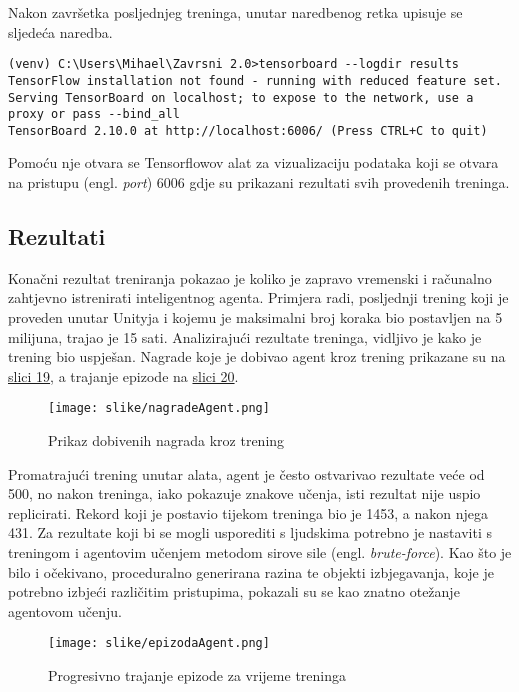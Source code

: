 \documentclass[]{foi} %
\begin{document}
Nakon završetka posljednjeg treninga, unutar naredbenog retka upisuje se sljedeća naredba. 

\begin{lstlisting}[style=cmd, numbers=none, caption={Vizualizacija rezultata treninga}]
(venv) C:\Users\Mihael\Zavrsni 2.0>tensorboard --logdir results
TensorFlow installation not found - running with reduced feature set.
Serving TensorBoard on localhost; to expose to the network, use a proxy or pass --bind_all
TensorBoard 2.10.0 at http://localhost:6006/ (Press CTRL+C to quit)
\end{lstlisting}

Pomoću nje otvara se Tensorflowov alat za vizualizaciju podataka koji se otvara na pristupu (engl. \textit{port}) 6006 gdje su prikazani rezultati svih provedenih treninga. 

\subsection{Rezultati}
Konačni rezultat treniranja pokazao je koliko je zapravo vremenski i računalno zahtjevno istrenirati inteligentnog agenta. Primjera radi, posljednji trening koji je proveden unutar Unityja i kojemu je maksimalni broj koraka bio postavljen na 5 milijuna, trajao je 15 sati. Analizirajući rezultate treninga, vidljivo je kako je trening bio uspješan. Nagrade koje je dobivao agent kroz trening prikazane su na \hyperref[img:nagrade]{slici 19}, a trajanje epizode na \hyperref[img:epizode]{slici 20}.

\begin{figure}[H]
    \centering
    \texttt{[image: slike/nagradeAgent.png]}
    \caption{Prikaz dobivenih nagrada kroz trening}
\end{figure}
\label{img:nagrade}

Promatrajući trening unutar alata, agent je često ostvarivao rezultate veće od 500, no nakon treninga, iako pokazuje znakove učenja, isti rezultat nije uspio replicirati. Rekord koji je postavio tijekom treninga bio je 1453, a nakon njega 431. Za rezultate koji bi se mogli usporediti s ljudskima potrebno je nastaviti s treningom i agentovim učenjem metodom sirove sile (engl. \textit{brute-force}). Kao što je bilo i očekivano, proceduralno generirana razina te objekti izbjegavanja, koje je potrebno izbjeći različitim pristupima, pokazali su se kao znatno otežanje agentovom učenju.

\begin{figure}[H]
    \centering
    \texttt{[image: slike/epizodaAgent.png]}
    \caption{Progresivno trajanje epizode za vrijeme treninga}
\end{figure}
\label{img:epizode}
\end{document}
